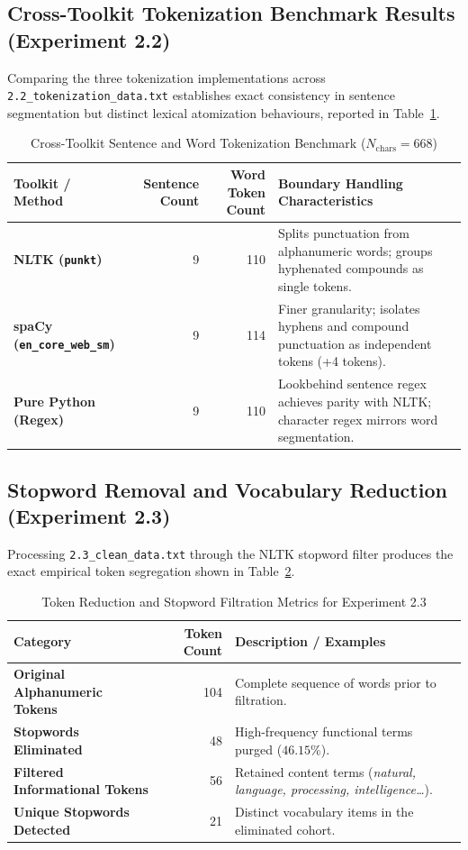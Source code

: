 \subsection{Cross-Toolkit Tokenization Benchmark Results (Experiment 2.2)}
Comparing the three tokenization implementations across \texttt{2.2\_tokenization\_data.txt} establishes exact consistency in sentence segmentation but distinct lexical atomization behaviours, reported in Table~\ref{tab:exp2_tok_comparison}.
\begin{table}[H]
\centering
\small
\caption{Cross-Toolkit Sentence and Word Tokenization Benchmark ($N_{\text{chars}} = 668$)}
\label{tab:exp2_tok_comparison}
\begin{tabular}{lrrp{7.5cm}}
\toprule
\textbf{Toolkit / Method} & \textbf{Sentence Count} & \textbf{Word Token Count} & \textbf{Boundary Handling Characteristics} \\
\midrule
\textbf{NLTK (\texttt{punkt})} & 9 & 110 & Splits punctuation from alphanumeric words; groups hyphenated compounds as single tokens. \\
\textbf{spaCy (\texttt{en\_core\_web\_sm})} & 9 & 114 & Finer granularity; isolates hyphens and compound punctuation as independent tokens (+4 tokens). \\
\textbf{Pure Python (Regex)} & 9 & 110 & Lookbehind sentence regex achieves parity with NLTK; character regex mirrors word segmentation. \\
\bottomrule
\end{tabular}
\end{table}

\subsection{Stopword Removal and Vocabulary Reduction (Experiment 2.3)}
Processing \texttt{2.3\_clean\_data.txt} through the NLTK stopword filter produces the exact empirical token segregation shown in Table~\ref{tab:exp2_stopword_summary}.
\begin{table}[H]
\centering
\small
\caption{Token Reduction and Stopword Filtration Metrics for Experiment 2.3}
\label{tab:exp2_stopword_summary}
\begin{tabular}{lrp{8cm}}
\toprule
\textbf{Category} & \textbf{Token Count} & \textbf{Description / Examples} \\
\midrule
\textbf{Original Alphanumeric Tokens} & 104 & Complete sequence of words prior to filtration. \\
\textbf{Stopwords Eliminated} & 48 & High-frequency functional terms purged ($46.15\%$). \\
\textbf{Filtered Informational Tokens} & 56 & Retained content terms (\textit{natural, language, processing, intelligence\dots}). \\
\textbf{Unique Stopwords Detected} & 21 & Distinct vocabulary items in the eliminated cohort. \\
\bottomrule
\end{tabular}
\end{table}

